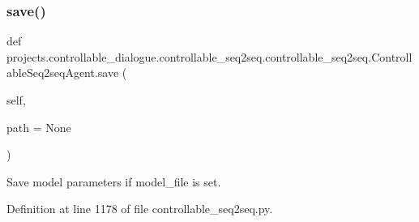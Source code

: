 \subsubsection{\texorpdfstring{save()}{save()}}
{\footnotesize\ttfamily def projects.\+controllable\+\_\+dialogue.\+controllable\+\_\+seq2seq.\+controllable\+\_\+seq2seq.\+Controllable\+Seq2seq\+Agent.\+save (\begin{DoxyParamCaption}\item[{}]{self,  }\item[{}]{path = {\ttfamily None} }\end{DoxyParamCaption})}

\begin{DoxyVerb}Save model parameters if model_file is set.
\end{DoxyVerb}
 

Definition at line 1178 of file controllable\+\_\+seq2seq.\+py.


